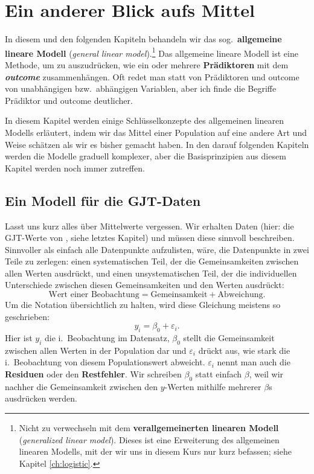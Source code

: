 \documentclass[oneside, 10pt]{book}\usepackage[]{graphicx}\usepackage[]{xcolor}
\begin{document}
\chapter{Ein anderer Blick aufs Mittel}\label{ch:linmod}
In diesem und den folgenden Kapiteln behandeln wir das
sog.\ \textbf{allgemeine lineare Modell}
(\textit{general linear model}).\footnote{Nicht zu verwechseln
mit dem \textbf{verallgemeinerten linearen Modell}
(\textit{generalized linear model}).
Dieses ist eine Erweiterung des allgemeinen linearen Modells, 
mit der wir uns in diesem Kurs nur kurz befassen; siehe Kapitel \ref{ch:logistic}.}
Das allgemeine lineare Modell ist eine Methode,
um zu auszudrücken, wie ein oder mehrere \textbf{Prädiktoren}
mit dem \textbf{\textit{outcome}} zusammenhängen.
Oft redet man statt von Prädiktoren und outcome
von unabhängigen bzw.\ abhängigen Variablen,
aber ich finde die Begriffe Prädiktor und outcome
deutlicher.

In diesem Kapitel werden einige Schlüsselkonzepte des
allgemeinen linearen Modells erläutert, indem wir das
Mittel einer Population auf eine andere Art und Weise
schätzen als wir es bisher gemacht haben. 
In den darauf folgenden Kapiteln werden die
Modelle graduell komplexer, aber die Basisprinzipien
aus diesem Kapitel werden noch immer zutreffen.

\section{Ein Modell für die GJT-Daten}
Lasst uns kurz alles über Mittelwerte vergessen.
Wir erhalten Daten (hier: die GJT-Werte von \citet{DeKeyser2010},
siehe letztes Kapitel) und müssen
diese sinnvoll beschreiben. Sinnvoller als einfach
alle Datenpunkte aufzulisten, wäre, die Datenpunkte
in zwei Teile zu zerlegen: einen systematischen Teil, der die
Gemeinsamkeiten zwischen allen Werten ausdrückt,
und einen unsystematischen Teil, der die individuellen Unterschiede
zwischen diesen Gemeinsamkeiten und den Werten ausdrückt:
\[
\textrm{Wert einer Beobachtung} = \textrm{Gemeinsamkeit} + \textrm{Abweichung}.
\]
Um die Notation übersichtlich zu halten, wird diese Gleichung
meistens so geschrieben:
\begin{equation}\label{eq:beta0}
 y_i = \beta_0 + \varepsilon_i.
\end{equation}
Hier ist $y_i$ die i.\ Beobachtung im Datensatz,
$\beta_0$ stellt die Gemeinsamkeit zwischen allen
Werten in der Population dar
und $\varepsilon_i$ drückt aus, wie stark
die i.\ Beobachtung von diesem Populationswert abweicht.
$\varepsilon_i$ nennt man auch die \textbf{Residuen}
oder den \textbf{Restfehler}.
Wir schreiben $\beta_0$ statt einfach $\beta$,
weil wir nachher die Gemeinsamkeit
zwischen den $y$-Werten mithilfe mehrerer
$\beta$s ausdrücken werden.
\end{document}
